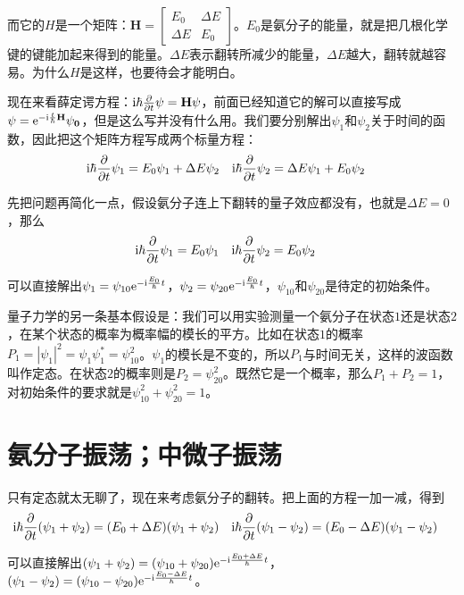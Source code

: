 而它的$H$是一个矩阵：$\mathbf{H}=\begin{bmatrix} E_0 & \Delta E \\ \Delta E & E_0 \end{bmatrix}$。$E_0$是氨分子的能量，就是把几根化学键的键能加起来得到的能量。$\Delta E$表示翻转所减少的能量，$\Delta E$越大，翻转就越容易。为什么$H$是这样，也要待会才能明白。

现在来看薛定谔方程：$\mathrm{i} \hbar \frac{\partial}{\partial t} \mathbf{\psi}=\mathbf{H} \psi$，前面已经知道它的解可以直接写成$\mathbf{\psi}=\mathrm{e}^{-\mathrm{i} \frac{t}{\hbar} \mathbf{H}} \mathbf{\psi_0}$，但是这么写并没有什么用。我们要分别解出$\psi_1$和$\psi_2$关于时间的函数，因此把这个矩阵方程写成两个标量方程：
\begin{align*}
\mathrm{i} \hbar \frac{\partial}{\partial t} \psi_1&=E_0 \psi_1+\Delta E \psi_2 & \mathrm{i} \hbar \frac{\partial}{\partial t} \psi_2&=\Delta E \psi_1+E_0 \psi_2
\end{align*}

先把问题再简化一点，假设氨分子连上下翻转的量子效应都没有，也就是$\Delta E=0$，那么
\begin{align*}
\mathrm{i} \hbar \frac{\partial}{\partial t} \psi_1&=E_0 \psi_1 & \mathrm{i} \hbar \frac{\partial}{\partial t} \psi_2&=E_0 \psi_2
\end{align*}

可以直接解出$\psi_1=\psi_{1 0} \mathrm{e}^{-\mathrm{i} \frac{E_0}{\hbar} t}$，$\psi_2=\psi_{2 0} \mathrm{e}^{-\mathrm{i} \frac{E_0}{\hbar} t}$，$\psi_{1 0}$和$\psi_{2 0}$是待定的初始条件。

量子力学的另一条基本假设是：我们可以用实验测量一个氨分子在状态$1$还是状态$2$，在某个状态的概率为概率幅的模长的平方。比如在状态$1$的概率$P_1=|\psi_1|^2=\psi_1 \psi_1^*=\psi_{1 0}^2$。$\psi_1$的模长是不变的，所以$P_1$与时间无关，这样的波函数叫作定态。在状态$2$的概率则是$P_2=\psi_{2 0}^2$。既然它是一个概率，那么$P_1+P_2=1$，对初始条件的要求就是$\psi_{1 0}^2+\psi_{2 0}^2=1$。
\section{氨分子振荡；中微子振荡}
只有定态就太无聊了，现在来考虑氨分子的翻转。把上面的方程一加一减，得到
\begin{align*}
\mathrm{i} \hbar \frac{\partial}{\partial t} (\psi_1+\psi_2)&=(E_0+\Delta E)(\psi_1+\psi_2) & \mathrm{i} \hbar \frac{\partial}{\partial t} (\psi_1-\psi_2)&=(E_0-\Delta E)(\psi_1-\psi_2)
\end{align*}

可以直接解出$(\psi_1+\psi_2)=(\psi_{1 0}+\psi_{2 0}) \mathrm{e}^{-\mathrm{i} \frac{E_0+\Delta E}{\hbar} t}$，$(\psi_1-\psi_2)=(\psi_{1 0}-\psi_{2 0}) \mathrm{e}^{-\mathrm{i} \frac{E_0-\Delta E}{\hbar} t}$。

